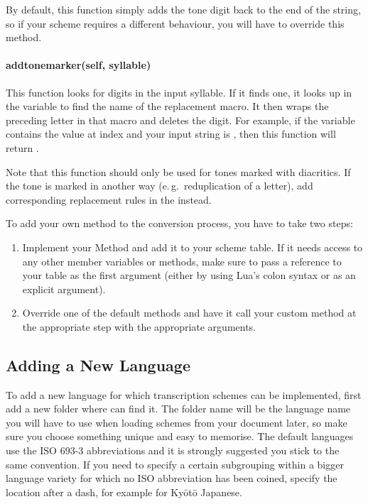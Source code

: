 \documentclass{ltxdockit}
\begin{document}
By default, this function simply adds the tone digit back to the end of the
string, so if your scheme requires a different behaviour, you will have to
override this method.

\paragraph{add\textunderscore{}tone\textunderscore{}marker(self, syllable)}

This function looks for digits in the input syllable. If it finds one, it looks
up in the  variable to find the name of the
replacement macro. It then wraps the preceding letter in that macro and deletes
the digit. For example, if the  variable
contains the value  at index  and your input string is
, then this function will return .

Note that this function should only be used for tones marked with diacritics. If
the tone is marked in another way (e.\,g.\ reduplication of a letter), add
corresponding replacement rules in the
 instead.


To add your own method to the conversion process, you have to take two steps:

\begin{enumerate}
  \item Implement your Method and add it to your scheme table. If it needs
    access to any other member variables or methods, make sure to pass a
    reference to your table as the first argument (either by using Lua's colon
    syntax or as an explicit argument).
  \item Override one of the default methods and have it call your custom method
    at the appropriate step with the appropriate arguments.
\end{enumerate}

\subsection{Adding a New Language}

To add a new language for which transcription schemes can be implemented, first
add a new folder where  can find it. The folder name will be the
language name you will have to use when loading schemes from your document
later, so make sure you choose something unique and easy to memorise. The
default languages use the ISO 693-3 abbreviations and it is strongly suggested you
stick to the same convention. If you need to specify a certain subgrouping
within a bigger language variety for which no ISO abbreviation has been coined,
specify the location after a dash, for example  for
Ky\={o}t\={o} Japanese.
\end{document}
